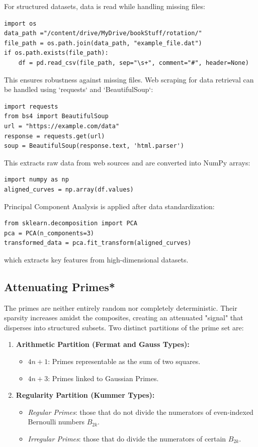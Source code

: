 For structured datasets, data is read while handling missing files:
\begin{lstlisting}
import os
data_path ="/content/drive/MyDrive/bookStuff/rotation/"
file_path = os.path.join(data_path, "example_file.dat")
if os.path.exists(file_path):
    df = pd.read_csv(file_path, sep="\s+", comment="#", header=None)
\end{lstlisting}
This ensures robustness against missing files. Web scraping for data retrieval can be handled using `requests` and `BeautifulSoup`:
\begin{lstlisting}
import requests
from bs4 import BeautifulSoup
url = "https://example.com/data"
response = requests.get(url)
soup = BeautifulSoup(response.text, 'html.parser')
\end{lstlisting}
This extracts raw data from web sources and are converted into NumPy arrays:
\begin{lstlisting}
import numpy as np
aligned_curves = np.array(df.values)
\end{lstlisting}

\noindent
Principal Component Analysis is applied after data standardization:
\begin{lstlisting}
from sklearn.decomposition import PCA
pca = PCA(n_components=3)
transformed_data = pca.fit_transform(aligned_curves)
\end{lstlisting}
which extracts key features from high-dimensional datasets.

\subsection{Attenuating Primes*}

The primes are neither entirely random nor completely deterministic. Their sparsity increases amidst the composites, creating an attenuated "signal" that disperses into structured subsets. Two distinct partitions of the prime set are:
\begin{enumerate}
    \item \textbf{Arithmetic Partition (Fermat and Gauss Types):} 
    \begin{itemize}
        \item \( 4n+1 \): Primes representable as the sum of two squares.
        \item \( 4n+3 \): Primes linked to Gaussian Primes.
    \end{itemize}
    \item \textbf{Regularity Partition (Kummer Types):} 
    \begin{itemize}
        \item \textit{Regular Primes}: those that do not divide the numerators of even-indexed Bernoulli numbers \( B_{2k} \).
        \item \textit{Irregular Primes}: those that do divide the numerators of certain \( B_{2k} \).
    \end{itemize}
\end{enumerate}

